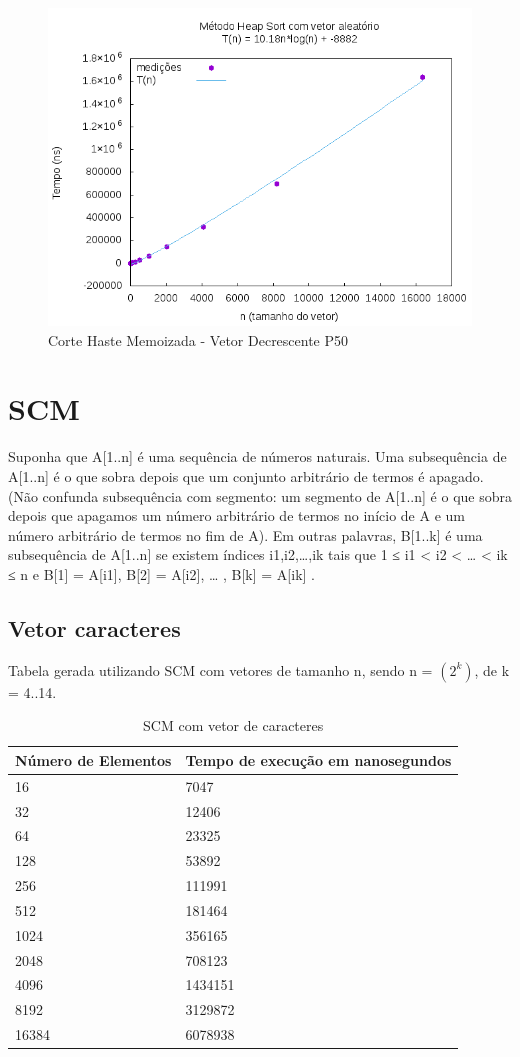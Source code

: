 \documentclass[12pt,a4paper,twoside]{report}
\begin{document}
\begin{figure}[H]
    \centering
    \includegraphics[width=0.7\linewidth]{graficos/HeapSort/vIntAleatorio/vIntAleatorio.png}
  \caption{Corte Haste Memoizada - Vetor Decrescente P50}
\end{figure}

\section{SCM}

Suponha que A[1..n] é uma sequência de números naturais. Uma subsequência de A[1..n] é o que sobra depois que um conjunto arbitrário de termos é apagado.  (Não confunda subsequência com segmento: um segmento de A[1..n] é o que sobra depois que apagamos um número arbitrário de termos no início de A e um número arbitrário de termos no fim de A). Em outras palavras, B[1..k] é uma subsequência de A[1..n] se existem índices i1,i2,…,ik tais que   1 ≤ i1 < i2 < … < ik ≤ n   e
B[1] = A[i1],  B[2] = A[i2],  … ,  B[k] = A[ik] .

\subsection{Vetor caracteres}
Tabela gerada utilizando SCM com vetores de tamanho n, sendo n = $(2^k)$, de k = 4..14.
\begin{table}[H]
\centering
\caption{SCM com vetor de caracteres}
\label{my-label}
\begin{tabular}{|l|l|}
\hline
\multicolumn{1}{|c|}{\textbf{Número de Elementos}} & \multicolumn{1}{c|}{\textbf{Tempo de execução em nanosegundos}} \\ \hline
16 & 7047 \\ \hline
32 & 12406 \\ \hline
64 & 23325 \\ \hline
128 & 53892 \\ \hline
256 & 111991 \\ \hline
512 & 181464 \\ \hline
1024 & 356165 \\ \hline
2048 & 708123 \\ \hline
4096 & 1434151 \\ \hline
8192 & 3129872 \\ \hline
16384 & 6078938 \\ \hline

\end{tabular}
\end{table}
\end{document}
